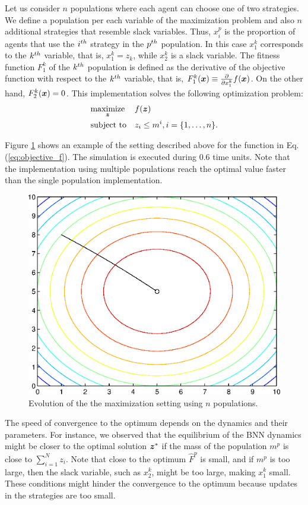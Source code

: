 Let us consider $n$ populations where each agent can choose one of two strategies. 
We define a population per each variable of the maximization problem and also $n$ additional strategies that resemble slack variables.
Thus, $x_i^p$ is the proportion of agents that use the $i^{th}$ strategy in the $p^{th}$ population. In this case $x_1^k$ corresponds to the $k^{th}$ variable, that is, $x_1^k = z_k$, while $x_2^k$ is a slack variable.
%
The fitness function $F_1^k$ of the $k^{th}$ population is defined as the derivative of the objective function with respect to the $k^{th}$ variable, that is, $F_1^k(\boldsymbol{x}) \equiv \frac{\partial }{\partial x_1^k} f(\boldsymbol{x})$. On the other hand, $F_2^k(\boldsymbol{x}) = 0$.
This implementation solves the following optimization problem:
\begin{equation}
\begin{aligned}
& \underset{\boldsymbol{z}}{\text{maximize}}
& &  f(\boldsymbol{z}) \\
& \text{subject to}
& & z_i \leq m^i, i =\{1,\ldots,n\}.
\end{aligned}
\label{eq:opt_problem}
\end{equation}


Figure \ref{fig:maximization_b} shows an example of the setting described above for the function in Eq. (\ref{eq:objective_f}).
The simulation is executed during $0.6$ time units. Note that the implementation using multiple populations reach the optimal value faster than the single population implementation.
\begin{figure}[htb]
\centering
 \includegraphics[width=.5\textwidth]{./images/maximization_b.eps}
 \caption{Evolution of the the maximization setting using $n$ populations.}
 \label{fig:maximization_b}
\end{figure}


The speed of convergence to the optimum depends on the dynamics and their parameters. For instance, we observed that the equilibrium of the BNN dynamics might be closer to the optimal solution $\boldsymbol{z}^*$ if the mass of the population $m^p$ is close to $\sum_{i=1}^N z_i$. Note that close to the optimum $\hat{F}^p$ is small, and if $m^p$ is too large, then the slack variable, such as  $x_2^k$, might be too large, making $x_1^k$ small. These conditions might hinder the convergence to the optimum because updates in the strategies are too small.